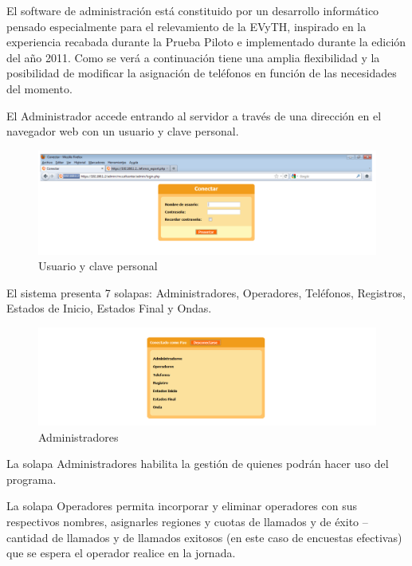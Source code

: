 \documentclass[
  openany]{book}
\begin{document}
El software de administración está constituido por un desarrollo informático pensado especialmente para el relevamiento de la EVyTH, inspirado en la experiencia recabada durante la Prueba Piloto e implementado durante la edición del año 2011. Como se verá a continuación tiene una amplia flexibilidad y la posibilidad de modificar la asignación de teléfonos en función de las necesidades del momento.

El Administrador accede entrando al servidor a través de una dirección en el navegador web con un usuario y clave personal.

\begin{figure}

{\centering \includegraphics[width=1\linewidth]{imagenes/figura6-01} 

}

\caption{Usuario y clave personal}\label{fig:conectar}
\end{figure}

El sistema presenta 7 solapas: Administradores, Operadores, Teléfonos, Registros, Estados de Inicio, Estados Final y Ondas.

\begin{figure}

{\centering \includegraphics[width=1\linewidth]{imagenes/figura6-02} 

}

\caption{Administradores}\label{fig:Adm}
\end{figure}

La solapa Administradores habilita la gestión de quienes podrán hacer uso del programa.

La solapa Operadores permita incorporar y eliminar operadores con sus respectivos nombres, asignarles regiones y cuotas de llamados y de éxito -- cantidad de llamados y de llamados exitosos (en este caso de encuestas efectivas) que se espera el operador realice en la jornada.
\end{document}
